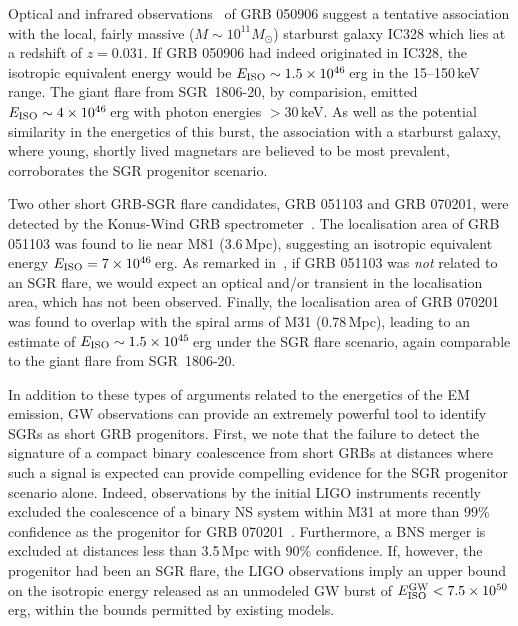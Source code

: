 Optical and infrared observations~\cite{Levan:2008} of GRB 050906 suggest a tentative association with the local, fairly massive ($M\sim 10^{11}M_{\odot}$) starburst galaxy IC328 which lies at a redshift of $z=0.031$.  If GRB 050906 had indeed originated in IC328, the isotropic equivalent energy would be $E_{\rm ISO}\sim 1.5 \times 10^{46}$\,erg in the 15--150\,keV range.  The giant flare from SGR~1806-20, by comparision,  emitted $E_{\rm ISO}\sim 4\times 10^{46}$\,erg with photon energies $>30$\,keV.  As well as the potential similarity in the energetics of this burst, the association with a starburst galaxy, where young, shortly lived magnetars are believed to be most prevalent, corroborates the SGR progenitor scenario.  

Two other short GRB-SGR flare candidates, GRB 051103 and GRB 070201, were detected by the Konus-Wind GRB spectrometer~\cite{Frederiks:2008,Ofek:2008}.  The localisation area of GRB 051103 was found to lie near M81 (3.6\,Mpc), suggesting an isotropic equivalent energy $E_{\rm ISO}=7\times 10^{46}$\,erg.  As remarked in~\cite{Frederiks:2008}, if GRB 051103 was \emph{not} related to an SGR flare, we would expect an optical and/or transient in the localisation area, which has not been observed.  Finally, the localisation area of GRB 070201 was found to overlap with the spiral arms of M31 ($0.78$\,Mpc), leading to an estimate of $E_{\rm ISO}\sim 1.5\times 10^{45}$\,erg under the SGR flare scenario, again comparable to the giant flare from SGR~1806-20.

In addition to these types of arguments related to the energetics of the EM emission, GW observations can provide an extremely powerful tool to identify SGRs as short GRB progenitors.  First, we note that the failure to detect the signature of a compact binary coalescence from short GRBs at distances where such a signal is expected can provide compelling evidence for the SGR progenitor scenario alone.  Indeed, observations by the initial LIGO instruments recently excluded the coalescence of a binary NS system within M31 at more than $99\%$ confidence as the progenitor for GRB 070201~\cite{LSC:GRB070201}.  Furthermore, a BNS merger is excluded at distances less than 3.5\,Mpc with $90\%$ confidence.  If, however, the progenitor had been an SGR flare, the LIGO observations imply an upper bound on the isotropic energy released as an unmodeled GW burst of $E_{\rm ISO}^{\rm GW}< 7.5 \times 10^{50}$\,erg, within the bounds permitted by existing models.

